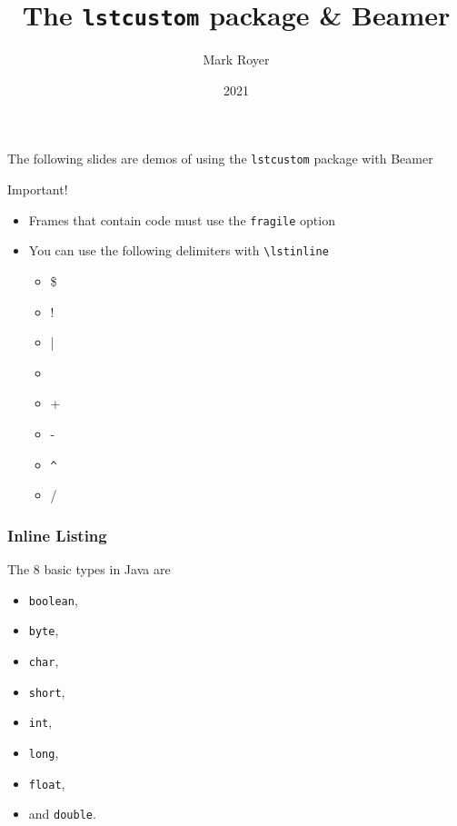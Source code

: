 \documentclass{beamer}
\title{The \texttt{lstcustom} package \& Beamer}
\author{Mark Royer}
\date{2021}
\begin{document}
\frame{\titlepage}

\begin{frame}[fragile]

  The following slides are demos of using the \texttt{lstcustom}
  package with Beamer

  \begin{alertblock}{Important!}
    \begin{itemize}
    \item Frames that contain code must use the \texttt{fragile}
      option
    \item You can use the following delimiters with
      \texttt{\textbackslash lstinline}
      \begin{itemize}
      \item \$
      \item !
      \item |
      \item \texttildelow
      \item +
      \item -
      \item \verb=^=
      \item /
      \end{itemize}
    \end{itemize}

  \end{alertblock}
  
\end{frame}


\begin{frame}[fragile]
  \frametitle{Inline Listing}
  
  The 8 basic types in Java are
  \begin{itemize}
  \item \lstinline$boolean$,
  \item \lstinline!byte!,
  \item \lstinline|char|,
  \item \lstinline~short~,
  \item \lstinline+int+,
  \item \lstinline-long-,
  \item \lstinline^float^,
  \item and \lstinline/double/.
  \end{itemize}

\end{frame}
\end{document}
